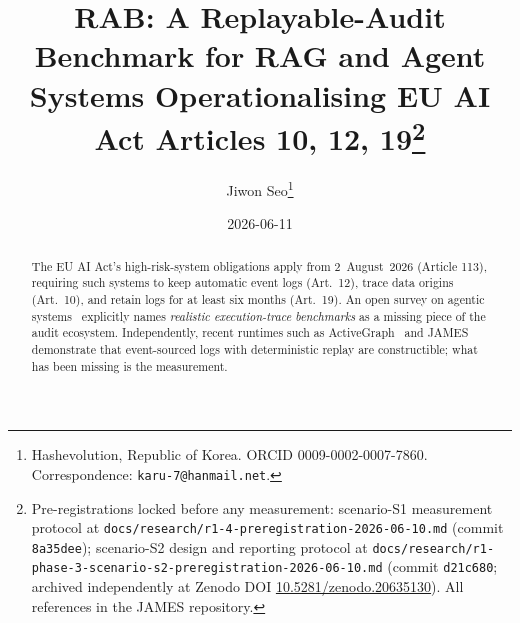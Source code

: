 \documentclass[11pt,a4paper]{article}
\title{RAB: A Replayable-Audit Benchmark for RAG and Agent Systems Operationalising EU AI Act Articles 10, 12, 19\thanks{Pre-registrations locked before any measurement: scenario-S1 measurement protocol at \texttt{docs/research/r1-4-preregistration-2026-06-10.md} (commit \texttt{8a35dee}); scenario-S2 design and reporting protocol at \texttt{docs/research/r1-phase-3-scenario-s2-preregistration-2026-06-10.md} (commit \texttt{d21c680}; archived independently at Zenodo DOI \href{https://doi.org/10.5281/zenodo.20635130}{10.5281/zenodo.20635130}). All references in the JAMES repository.}}
\author{
  Jiwon Seo\thanks{Hashevolution, Republic of Korea. ORCID 0009-0002-0007-7860. Correspondence: \texttt{karu-7@hanmail.net}.}
}
\date{2026-06-11}
\begin{document}
\maketitle

\begin{abstract}
The EU AI Act's high-risk-system obligations apply from 2~August~2026 (Article 113), requiring such systems to keep automatic event logs (Art.~12), trace data origins (Art.~10), and retain logs for at least six months (Art.~19). An open survey on agentic systems~\cite{wang2026evidencetrace} explicitly names \emph{realistic execution-trace benchmarks} as a missing piece of the audit ecosystem. Independently, recent runtimes such as ActiveGraph~\cite{nakajima2026activegraph} and JAMES demonstrate that event-sourced logs with deterministic replay are constructible; what has been missing is the measurement.


\end{abstract}
\end{document}
